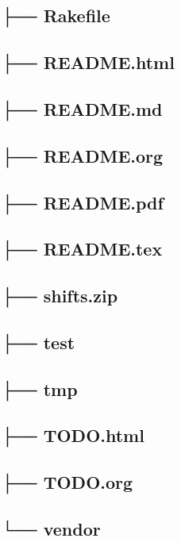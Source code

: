 \documentclass[11pt]{article}
\begin{document}
\subsection*{├── Rakefile}
\label{sec-1-21}
\subsection*{├── README.html}
\label{sec-1-22}
\subsection*{├── README.md}
\label{sec-1-23}
\subsection*{├── README.org}
\label{sec-1-24}
\subsection*{├── README.pdf}
\label{sec-1-25}
\subsection*{├── README.tex}
\label{sec-1-26}
\subsection*{├── shifts.zip}
\label{sec-1-27}
\subsection*{├── test}
\label{sec-1-28}
\subsection*{├── tmp}
\label{sec-1-29}
\subsection*{├── TODO.html}
\label{sec-1-30}
\subsection*{├── TODO.org}
\label{sec-1-31}
\subsection*{└── vendor}
\label{sec-1-32}
\end{document}

